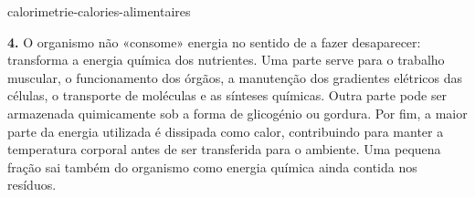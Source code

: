 \begin{exo}{calorimetrie-calories-alimentaires}
\begin{solution}
\textbf{4.} O organismo não «consome» energia no sentido de a fazer desaparecer: transforma a energia química dos nutrientes. Uma parte serve para o trabalho muscular, o funcionamento dos órgãos, a manutenção dos gradientes elétricos das células, o transporte de moléculas e as sínteses químicas. Outra parte pode ser armazenada quimicamente sob a forma de glicogénio ou gordura. Por fim, a maior parte da energia utilizada é dissipada como calor, contribuindo para manter a temperatura corporal antes de ser transferida para o ambiente. Uma pequena fração sai também do organismo como energia química ainda contida nos resíduos.
\end{solution}
\end{exo}
